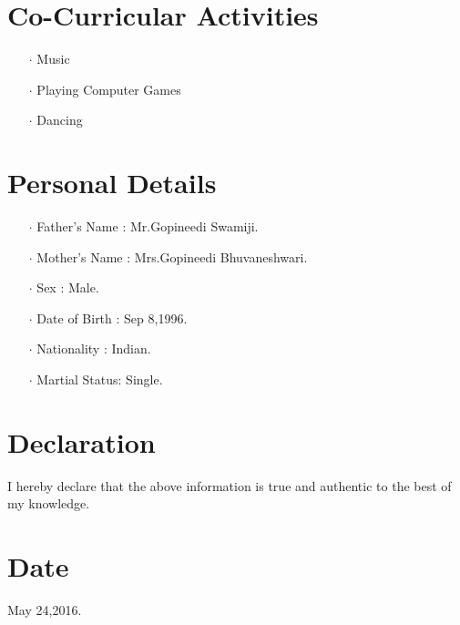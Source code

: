 \documentclass[12pt]{article}
\begin{document}
\section*{Co-Curricular Activities}
\begin{itemize}
\item[$\cdot$] Music
\item[$\cdot$] Playing Computer Games 
\item[$\cdot$] Dancing
\end{itemize}
\section*{Personal Details}
\begin{itemize}
\item[$\cdot$]Father's Name : Mr.Gopineedi Swamiji.
\item[$\cdot$]Mother's Name : Mrs.Gopineedi Bhuvaneshwari.
\item[$\cdot$]Sex           : Male.
\item[$\cdot$]Date of Birth : Sep 8,1996.
\item[$\cdot$]Nationality   : Indian.
\item[$\cdot$]Martial Status: Single.
\end{itemize}
\section*{Declaration} I hereby declare that the above information is true and authentic to the best of my knowledge.
\section*{Date} May 24,2016.
\end{document}
